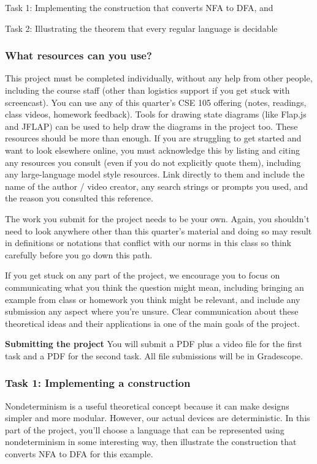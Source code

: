 Task 1: Implementing the construction that converts NFA to DFA, and

Task 2: Illustrating the theorem that every regular language is decidable


\subsubsection*{What resources can you use?} This project must be completed individually, 
without any help from other people, including the course staff (other than logistics support if 
you get stuck with screencast).
You can use any of this quarter's CSE 105 offering (notes, readings, class videos, homework feedback). 
Tools for drawing state diagrams (like Flap.js and JFLAP) can be used to help draw the diagrams 
in the project too.
These resources should be more than enough.
If you are struggling to get started and want to look elsewhere online, 
you must acknowledge this by listing and citing any resources you consult 
(even if you do not explicitly quote them), including any large-language model style resources. 
Link directly to them and include the name of the author / video creator, 
any search strings or prompts you used, and the reason you consulted this reference.

The work you submit for the project needs to be your own. Again, you shouldn't need to look anywhere 
other than this quarter's material and doing so may result in definitions or notations that 
conflict with our norms in this class so think carefully before you go down this path.

If you get stuck on any part of the project, we encourage you to focus on communicating what you think 
the question might mean, including bringing an example from class or homework you think might be relevant, and 
include any submission any aspect where you're unsure. Clear communication about these
theoretical ideas and their applications ia one of the main goals of the project.

{\bf Submitting the project} You will submit a PDF plus a video file for the first task and a PDF for the 
second task. All file submissions will be in Gradescope.

\newpage
\subsubsection*{Task 1: Implementing a construction}

Nondeterminism is a useful theoretical concept because it can make designs simpler and more modular. 
However, our actual devices are deterministic. In this part of the project, you'll choose a 
language that can be represented using nondeterminism in some interesting way, then illustrate
the construction that converts NFA to DFA for this example.

